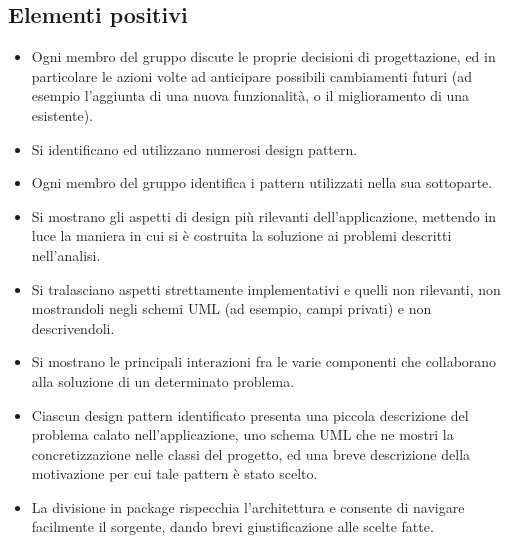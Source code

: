 \documentclass[a4paper,12pt]{report}
\begin{document}
\subsection*{Elementi positivi}

\begin{itemize}
	\item Ogni membro del gruppo discute le proprie decisioni di progettazione, ed in particolare le azioni volte ad anticipare possibili cambiamenti futuri (ad esempio l'aggiunta di una nuova funzionalità, o il miglioramento di una esistente).
	\item Si identificano ed utilizzano numerosi design pattern.
	\item Ogni membro del gruppo identifica i pattern utilizzati nella sua sottoparte.
	\item Si mostrano gli aspetti di design più rilevanti dell'applicazione, mettendo in luce la maniera in cui si è costruita la soluzione ai problemi descritti nell'analisi.
	\item Si tralasciano aspetti strettamente implementativi e quelli non rilevanti, non mostrandoli negli schemi UML (ad esempio, campi privati) e non descrivendoli.
	\item Si mostrano le principali interazioni fra le varie componenti che collaborano alla soluzione di un determinato problema.
	\item Ciascun design pattern identificato presenta una piccola descrizione del problema calato nell'applicazione, uno schema UML che ne mostri la concretizzazione nelle classi del progetto, ed una breve descrizione della motivazione per cui tale pattern è stato scelto.
	\item La divisione in package rispecchia l'architettura e consente di navigare facilmente il sorgente, dando brevi giustificazione alle scelte fatte.
\end{itemize}
\end{document}
